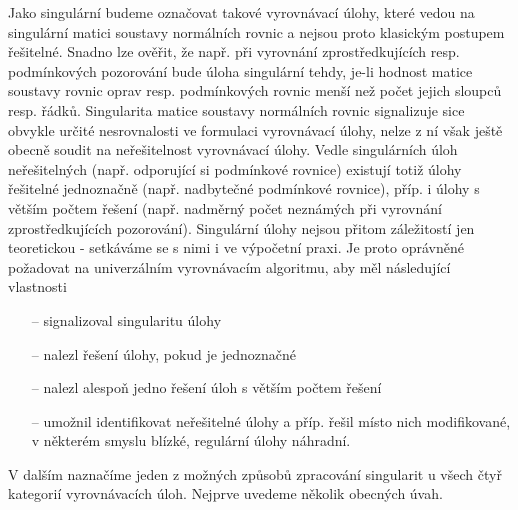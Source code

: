 

Jako  singulární budeme označovat takové vyrovnávací úlohy,
které vedou na singulární matici soustavy normálních rovnic a nejsou
proto klasickým postupem řešitelné. Snadno lze ověřit, že např. při
vyrovnání zprostředkujících resp. podmínkových pozorování bude úloha
singulární tehdy, je-li hodnost matice soustavy rovnic oprav
resp. podmínkových rovnic menší než počet jejich sloupců
resp. řádků. Singularita matice soustavy normálních rovnic signalizuje
sice obvykle určité nesrovnalosti ve formulaci vyrovnávací úlohy,
nelze z ní však ještě obecně soudit na neřešitelnost vyrovnávací
úlohy. Vedle singulárních úloh neřešitelných (např. odporující si
podmínkové rovnice) existují totiž úlohy řešitelné jednoznačně
(např. nadbytečné podmínkové rovnice), příp. i úlohy s větším počtem
řešení (např. nadměrný počet neznámých při vyrovnání zprostředkujících
pozorování).  Singulární úlohy nejsou přitom záležitostí jen
teoretickou - setkáváme se s nimi i ve výpočetní praxi. Je proto
oprávněné požadovat na univerzálním vyrovnávacím algoritmu, aby měl
následující vlastnosti

\begin{itemize}

\item[--] signalizoval singularitu úlohy

\item[--] nalezl řešení úlohy, pokud je jednoznačné

\item[--] nalezl alespoň jedno řešení úloh s větším počtem řešení

\item[--] umožnil identifikovat neřešitelné úlohy a příp. řešil místo
  nich modifikované, v některém smyslu blízké, regulární
  úlohy náhradní.
\end{itemize}

\noindent V dalším naznačíme jeden z možných způsobů zpracování singularit u
všech čtyř kategorií vyrovnávacích úloh. Nejprve uvedeme několik
obecných úvah.


